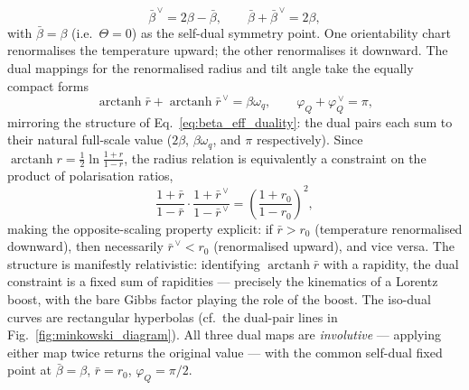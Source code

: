 \begin{equation}
    \bar\beta^{\,\vee} = 2\beta - \bar\beta,
    \qquad
    \bar\beta + \bar\beta^{\,\vee} = 2\beta,
    \label{eq:beta_eff_duality}
\end{equation}
with \(\bar\beta = \beta\) (i.e.\ \(\Theta = 0\)) as the self-dual symmetry
point. One orientability chart renormalises the temperature upward; the other renormalises it
downward. The dual mappings for the renormalised radius and tilt angle take the equally compact forms
\begin{equation}
    \operatorname{arctanh}\bar r + \operatorname{arctanh}\bar r^{\,\vee} = \beta\omega_q,
    \qquad
    \varphi_Q + \varphi_Q^{\,\vee} = \pi,
    \label{eq:dual_radius_angle}
\end{equation}
mirroring the structure of Eq.~\eqref{eq:beta_eff_duality}: the dual pairs each sum to their
natural full-scale value (\(2\beta\), \(\beta\omega_q\), and \(\pi\) respectively).
Since \(\operatorname{arctanh}r = \frac{1}{2}\ln\frac{1+r}{1-r}\), the radius relation is
equivalently a constraint on the product of polarisation ratios,
\begin{equation}
    \frac{1+\bar r}{1-\bar r}\cdot\frac{1+\bar r^{\,\vee}}{1-\bar r^{\,\vee}}
    =\left(\frac{1+r_0}{1-r_0}\right)^{\!2},
    \label{eq:dual_radius_multiplicative}
\end{equation}
making the opposite-scaling property explicit: if \(\bar r > r_0\) (temperature renormalised
downward), then necessarily \(\bar r^{\,\vee} < r_0\) (renormalised upward), and vice versa.
The structure is manifestly relativistic: identifying \(\operatorname{arctanh}\bar r\) with a
rapidity, the dual constraint is a fixed sum of rapidities — precisely the kinematics of a Lorentz
boost, with the bare Gibbs factor playing the role of the boost. The iso-dual curves are
rectangular hyperbolas (cf.\ the dual-pair lines in
Fig.~\ref{fig:minkowski_diagram}). All three dual maps are \emph{involutive} — applying either
map twice returns the original value — with the common self-dual fixed point at
\(\bar\beta=\beta\), \(\bar r = r_0\), \(\varphi_Q=\pi/2\).

